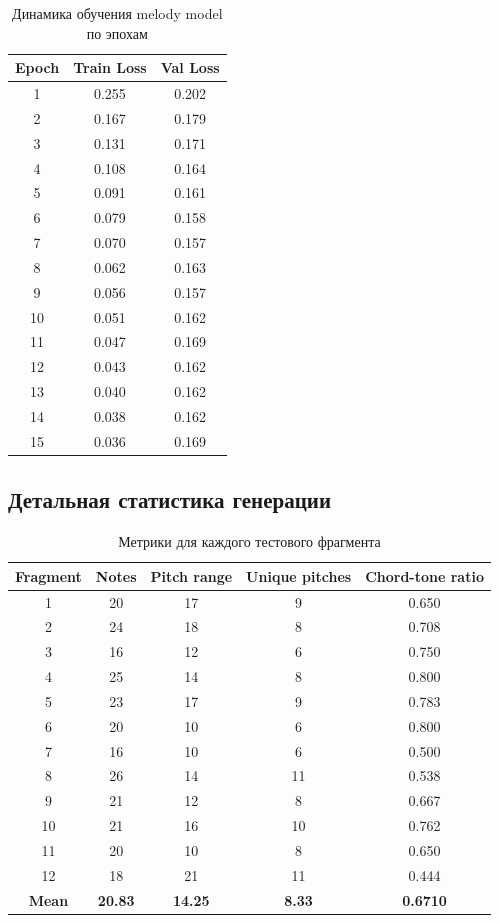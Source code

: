 \begin{table}[htbp]
\centering
\caption{Динамика обучения melody model по эпохам}
\begin{tabular}{|c|c|c|}
\hline
\textbf{Epoch} & \textbf{Train Loss} & \textbf{Val Loss} \\
\hline
1 & 0.255 & 0.202 \\
2 & 0.167 & 0.179 \\
3 & 0.131 & 0.171 \\
4 & 0.108 & 0.164 \\
5 & 0.091 & 0.161 \\
6 & 0.079 & 0.158 \\
7 & 0.070 & 0.157 \\
8 & 0.062 & 0.163 \\
9 & 0.056 & 0.157 \\
10 & 0.051 & 0.162 \\
11 & 0.047 & 0.169 \\
12 & 0.043 & 0.162 \\
13 & 0.040 & 0.162 \\
14 & 0.038 & 0.162 \\
15 & 0.036 & 0.169 \\
\hline
\end{tabular}
\end{table}

\subsection{Детальная статистика генерации}

\begin{table}[htbp]
\centering
\caption{Метрики для каждого тестового фрагмента}
\begin{tabular}{|c|c|c|c|c|}
\hline
\textbf{Fragment} & \textbf{Notes} & \textbf{Pitch range} & \textbf{Unique pitches} & \textbf{Chord-tone ratio} \\
\hline
1 & 20 & 17 & 9 & 0.650 \\
2 & 24 & 18 & 8 & 0.708 \\
3 & 16 & 12 & 6 & 0.750 \\
4 & 25 & 14 & 8 & 0.800 \\
5 & 23 & 17 & 9 & 0.783 \\
6 & 20 & 10 & 6 & 0.800 \\
7 & 16 & 10 & 6 & 0.500 \\
8 & 26 & 14 & 11 & 0.538 \\
9 & 21 & 12 & 8 & 0.667 \\
10 & 21 & 16 & 10 & 0.762 \\
11 & 20 & 10 & 8 & 0.650 \\
12 & 18 & 21 & 11 & 0.444 \\
\hline
\textbf{Mean} & \textbf{20.83} & \textbf{14.25} & \textbf{8.33} & \textbf{0.6710} \\
\hline
\end{tabular}
\end{table}


